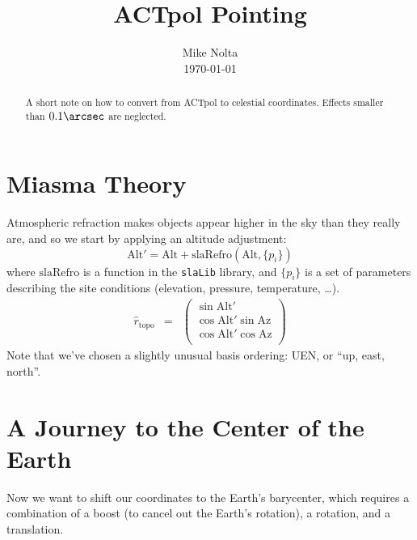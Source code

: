 \documentclass[10pt,preprint]{aastex}
\newcommand{\slalib}{\texttt{slaLib}}
\newcommand{\refraction}{\mathrm{slaRefro}}
\newcommand{\alt}{\mathrm{Alt}}
\newcommand{\az}{\mathrm{Az}}
\newcommand{\rtopo}{{\hat r}_\mathrm{topo}}
\begin{document}
\title{ACTpol Pointing}
\author{Mike Nolta\\\today}

\begin{abstract}
A short note on how to convert from ACTpol to celestial coordinates.
Effects smaller than $0.1\arcsec$ are neglected.
\end{abstract}

\section{Miasma Theory}

Atmospheric refraction makes objects appear higher in the sky than they really are,
and so we start by applying an altitude adjustment:
\begin{equation}
\alt' = \alt + \refraction(\alt,\{p_i\})
\end{equation}
where $\refraction$ is a function in the {\slalib} library, and $\{p_i\}$ is a set of parameters describing the site
conditions (elevation, pressure, temperature, \dots).
\begin{eqnarray}
\rtopo &=& \left(\begin{array}{c}
\sin \alt'\\
\cos\alt' \sin\az \\
\cos\alt' \cos\az \\
\end{array}\right)
\end{eqnarray}
Note that we've chosen a slightly unusual basis ordering: UEN, or ``up, east, north''.

\section{A Journey to the Center of the Earth}

Now we want to shift our coordinates to the Earth's barycenter, which requires
a combination of a boost (to cancel out the Earth's rotation), a rotation, and a translation.
\end{document}
